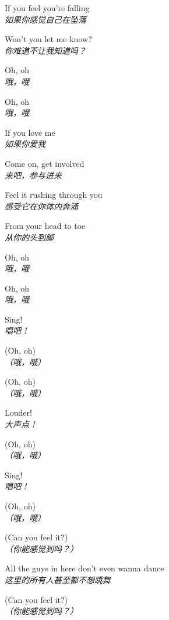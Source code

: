 \begin{spacing}{1.5}
\begin{flushleft}
If you feel you're falling\\
\textit{如果你感觉自己在坠落}\lyricspace

Won't you let me know?\\
\textit{你难道不让我知道吗？}\lyricspace

Oh, oh\\
\textit{哦，哦}\lyricspace

Oh, oh\\
\textit{哦，哦}\lyricspace

If you love me\\
\textit{如果你爱我}\lyricspace

Come on, get involved\\
\textit{来吧，参与进来}\lyricspace

Feel it rushing through you\\
\textit{感受它在你体内奔涌}\lyricspace

From your head to toe\\
\textit{从你的头到脚}\lyricspace

Oh, oh\\
\textit{哦，哦}\lyricspace

Oh, oh\\
\textit{哦，哦}\lyricspace

Sing!\\
\textit{唱吧！}\lyricspace

(Oh, oh)\\
\textit{（哦，哦）}\lyricspace

(Oh, oh)\\
\textit{（哦，哦）}\lyricspace

Louder!\\
\textit{大声点！}\lyricspace

(Oh, oh)\\
\textit{（哦，哦）}\lyricspace

Sing!\\
\textit{唱吧！}\lyricspace

(Oh, oh)\\
\textit{（哦，哦）}\lyricspace

(Can you feel it?)\\
\textit{（你能感觉到吗？）}\lyricspace

All the guys in here don't even wanna dance\\
\textit{这里的所有人甚至都不想跳舞}\lyricspace

(Can you feel it?)\\
\textit{（你能感觉到吗？）}\lyricspace


\end{flushleft}
\end{spacing}
